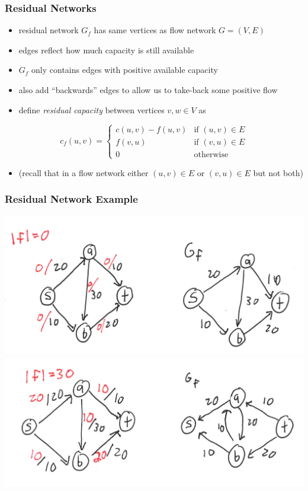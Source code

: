 \documentclass{beamer}
\begin{document}
\begin{frame} \frametitle{Residual Networks}
\begin{itemize}
  \item residual network $G_f$ has same vertices as flow network $G=(V,E)$
  \item edges reflect how much capacity is still available
  \item $G_f$ only contains edges with positive available capacity
  \item also add ``backwards'' edges to allow us to take-back some positive flow
  \item define \emph{residual capacity} between vertices $v, w \in V$ as
\end{itemize}

  \[
      c_f(u, v) =
      \begin{cases}
        c(u, v) - f(u, v) & \text{if } (u, v) \in E \\
        f(v, u) & \text{if } (v, u) \in E \\
        0 & \text{otherwise}
      \end{cases}
  \]

\begin{itemize}
  \item (recall that in a flow network either $(u, v) \in E$ or $(v, u) \in E$
    but not both)
\end{itemize}
\end{frame}

\begin{frame} \frametitle{Residual Network Example}
  \begin{center}
    \includegraphics[scale=.6]{residual-1.png} \\

    \includegraphics[scale=.6]{residual-2.png}
  \end{center}
\end{frame}
\end{document}
